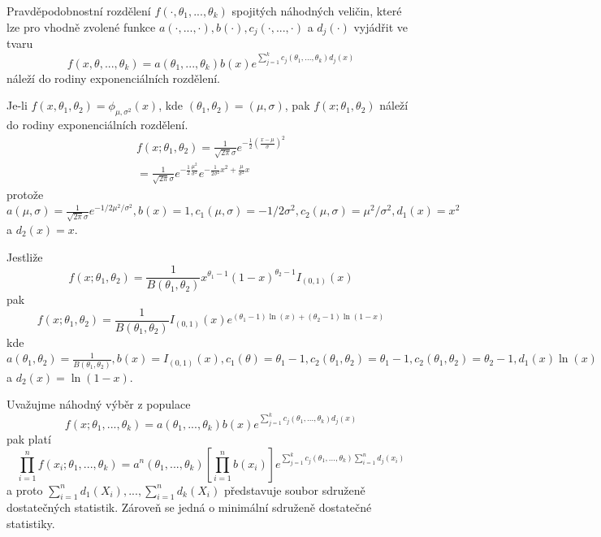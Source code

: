 \begin{definition}
Pravděpodobnostní rozdělení $f(\cdot, \theta_1, ..., \theta_k)$ spojitých náhodných veličin, které lze pro vhodně zvolené funkce $a(\cdot, ..., \cdot), b(\cdot), c_j(\cdot, ..., \cdot)$ a $d_j(\cdot)$ vyjádřit ve tvaru
\begin{equation*}
f(x, \theta, ..., \theta_k) = a(\theta_1, ..., \theta_k)b(x)e^{\sum_{j = 1}^k c_j(\theta_1, ..., \theta_k)d_j(x)}
\end{equation*}
náleží do rodiny exponenciálních rozdělení.
\end{definition}
 
\begin{example}
Je-li $f(x, \theta_1, \theta_2) = \phi_{\mu, \sigma^2}(x)$, kde $(\theta_1, \theta_2) = (\mu, \sigma)$, pak $f(x; \theta_1, \theta_2)$ náleží do rodiny exponenciálních rozdělení.
\begin{gather*}
f(x;\theta_1, \theta_2) = \frac{1}{\sqrt{2 \pi} \sigma} e^{-\frac{1}{2}\left(\frac{x - \mu}{\sigma}\right)^2}\\
= \frac{1}{\sqrt{2 \pi} \sigma} e^{-\frac{1}{2}\frac{\mu^2}{\sigma^2}}e^{-\frac{1}{2 \sigma^2}x^2 + \frac{\mu}{\sigma^2}x}
\end{gather*}
protože $a(\mu, \sigma) = \frac{1}{\sqrt{2 \pi}\sigma}e^{-1/2\mu^2/\sigma^2}, b(x) = 1, c_1(\mu, \sigma) = -1/2\sigma^2, c_2(\mu, \sigma) = \mu^2/\sigma^2, d_1(x) = x^2$ a $d_2(x) = x$.
\end{example}

\begin{example}
Jestliže
\begin{equation*}
f(x; \theta_1, \theta_2) = \frac{1}{B(\theta_1, \theta_2)}x^{\theta_1 - 1}(1 - x)^{\theta_2 - 1}I_{(0, 1)}(x)
\end{equation*}
pak
\begin{equation*}
f(x; \theta_1, \theta_2) = \frac{1}{B(\theta_1, \theta_2)}I_{(0, 1)}(x)e^{(\theta_1 - 1)\ln(x) + (\theta_2 - 1)\ln(1 - x)}
\end{equation*}
kde $a(\theta_1, \theta_2) = \frac{1}{B(\theta_1, \theta_2)}, b(x) = I_{(0, 1)}(x), c_1(\theta) = \theta_1 - 1, c_2(\theta_1, \theta_2) = \theta_1 - 1, c_2(\theta_1, \theta_2) = \theta_2 - 1, d_1(x) \ln(x)$ a $d_2(x) = \ln(1 - x)$.
\end{example}

Uvažujme náhodný výběr z populace
\begin{equation*}
f(x; \theta_1, ..., \theta_k) = a(\theta_1, ..., \theta_k)b(x)e^{\sum_{j = 1}^k c_j(\theta_1, ..., \theta_k)d_j(x)}
\end{equation*}
pak platí
\begin{equation*}
\prod_{i = 1}^n f(x_i; \theta_1, ..., \theta_k) = a^n(\theta_1, ..., \theta_k)\left[\prod_{i = 1}^n b(x_i)\right]e^{\sum_{j = 1}^k c_j(\theta_1, ..., \theta_k) \sum_{i = 1}^n d_j(x_i)}
\end{equation*}
a proto $\sum_{i = 1}^n d_1(X_i), ..., \sum_{i = 1}^n d_k(X_i)$ představuje soubor sdruženě dostatečných statistik. Zároveň se jedná o minimální sdruženě dostatečné statistiky.

